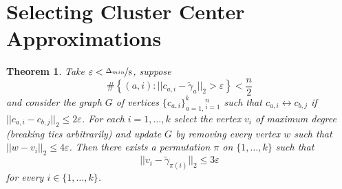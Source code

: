 \documentclass[10pt,a4paper]{article}
\newtheorem{theorem}{Theorem}
\begin{document}
\section{Selecting Cluster Center Approximations}
\label{sec:rounding}

\begin{theorem}
  \label{thm:rounding}
  Take $\varepsilon < \nicefrac{\Delta_{min}}{8}$, suppose
  \begin{equation*}
    \#\left\{ (a, i) : ||c_{a, i} - \tilde{\gamma}_{a}||_{2} > \varepsilon \right\} < \frac{n}{2}
  \end{equation*}
  and consider the graph $G$ of vertices $\{ c_{a, i} \}_{a = 1,}^{k}{}_{i = 1}^{n}$ such that $c_{a, i} \leftrightarrow c_{b, j}$ if $||c_{a, i} - c_{b, j}||_{2} \le 2\varepsilon$.
  For each $i = 1, \dots, k$ select the vertex $v_{i}$ of maximum degree (breaking ties arbitrarily) and update $G$ by removing every vertex $w$ such that $||w - v_{i}||_{2} \le 4\varepsilon$.
  Then there exists a permutation $\pi$ on $\{ 1, \dots, k \}$ such that
  \begin{equation*}
    ||v_{i} - \tilde{\gamma}_{\pi(i)}||_{2} \le 3\varepsilon
  \end{equation*}
  for every $i \in \{ 1, \dots, k \}$.
\end{theorem}
\end{document}
